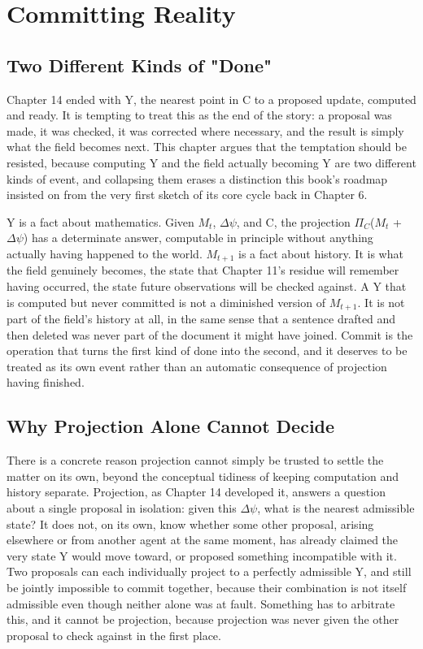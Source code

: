 \chapter{Committing Reality}

\section{Two Different Kinds of "Done"}

Chapter 14 ended with Y, the nearest point in C to a proposed update, computed and ready. It is tempting to treat this as the end of the story: a proposal was made, it was checked, it was corrected where necessary, and the result is simply what the field becomes next. This chapter argues that the temptation should be resisted, because computing Y and the field actually becoming Y are two different kinds of event, and collapsing them erases a distinction this book's roadmap insisted on from the very first sketch of its core cycle back in Chapter 6.

Y is a fact about mathematics. Given \(M_t\), \(\Delta\psi\), and C, the projection \(\Pi_C\)(\(M_t\) + \(\Delta\psi\)) has a determinate answer, computable in principle without anything actually having happened to the world. \(M_{t+1}\) is a fact about history. It is what the field genuinely becomes, the state that Chapter 11's residue will remember having occurred, the state future observations will be checked against. A Y that is computed but never committed is not a diminished version of \(M_{t+1}\). It is not part of the field's history at all, in the same sense that a sentence drafted and then deleted was never part of the document it might have joined. Commit is the operation that turns the first kind of done into the second, and it deserves to be treated as its own event rather than an automatic consequence of projection having finished.

\section{Why Projection Alone Cannot Decide}

There is a concrete reason projection cannot simply be trusted to settle the matter on its own, beyond the conceptual tidiness of keeping computation and history separate. Projection, as Chapter 14 developed it, answers a question about a single proposal in isolation: given this \(\Delta\psi\), what is the nearest admissible state? It does not, on its own, know whether some other proposal, arising elsewhere or from another agent at the same moment, has already claimed the very state Y would move toward, or proposed something incompatible with it. Two proposals can each individually project to a perfectly admissible Y, and still be jointly impossible to commit together, because their combination is not itself admissible even though neither alone was at fault. Something has to arbitrate this, and it cannot be projection, because projection was never given the other proposal to check against in the first place.

